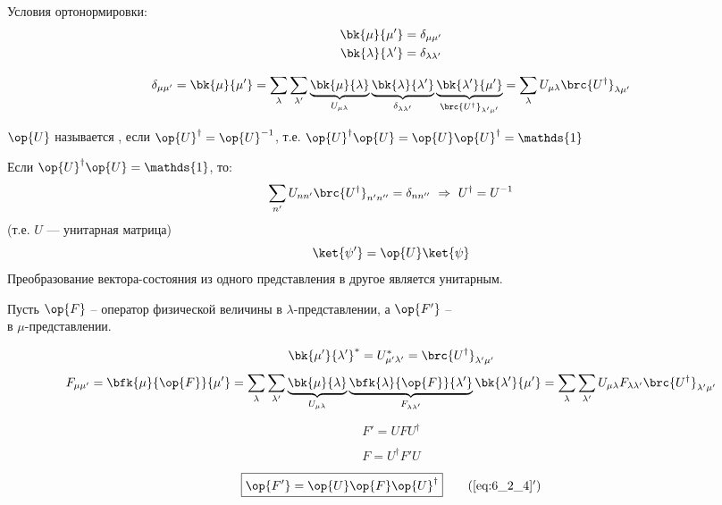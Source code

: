 Условия ортонормировки:
$$
\begin{gathered}
\bk{\mu}{\mu'}=\delta_{\mu\mu'}\\
\bk{\lambda}{\lambda'}=\delta_{\lambda\lambda'}
\end{gathered}
$$

$$
\delta_{\mu\mu'} = 
\bk{\mu}{\mu'} =
\sum_\lambda \sum_{\lambda'} \underbrace{\bk{\mu}{\lambda}}_{U_{\mu\lambda}}
\underbrace{\bk{\lambda}{\lambda'}}_{\delta_{\lambda\lambda'}}
\underbrace{\bk{\lambda'}{\mu'}}_{\brc{U^\dag}_{\lambda'\mu'}} =
\sum_\lambda U_{\mu\lambda}\brc{U^\dag}_{\lambda\mu'}
$$

\begin{defn}
$\op{U}$ называется , если $\op{U}^\dag = \op{U}^{-1}$, т.е. $\op{U}^\dag\op{U}=\op{U}\op{U}^\dag=\mathds{1}$
\end{defn}

Если $\op{U}^\dag\op{U}=\mathds{1}$, то:
$$
\sum_{n'}U_{nn'} \brc{U^\dag}_{n'n''}=\delta_{nn''}~ \Rightarrow~ U^\dag=U^{-1} 
$$
(т.е. $U$ --- унитарная матрица)
\begin{equation}
\label{eq:6_2_2}
\ket{\psi'}=\op{U}\ket{\psi}
\end{equation}
Преобразование вектора-состояния из одного представления в другое является унитарным. 

Пусть $\op{F}$ -- оператор физической величины в $\lambda$-представлении, а $\op{F'}$ --\\
в $\mu$-представлении.

$$
\bk{\mu'}{\lambda'}^*=U^*_{\mu'\lambda'}=\brc{U^\dag}_{\lambda'\mu'}
$$
\begin{equation}
\label{eq:6_2_3}
F_{\mu\mu'} = 
\bfk{\mu}{\op{F}}{\mu'} =
\sum_\lambda \sum_{\lambda'} 
\underbrace{\bk{\mu}{\lambda}}_{U_{\mu\lambda}}
\underbrace{\bfk{\lambda}{\op{F}}{\lambda'}}_{F_{\lambda\lambda'}}
\bk{\lambda'}{\mu'} =
\sum_\lambda \sum_{\lambda'} U_{\mu\lambda} F_{\lambda\lambda'} \brc{U^\dag}_{\lambda'\mu'}
\end{equation}

\begin{equation}
\label{eq:6_2_4}
\boxed{F'=U F U^\dag}
\end{equation}

\begin{equation}
\label{eq:6_2_5}
\boxed{F=U^\dag F' U}
\end{equation}

\begin{equation}
\label{eq:6_2_4_add}
\boxed{\op{F'}=\op{U} \op{F} \op{U}^\dag}
\tag{\ref{eq:6_2_4}$'$}
\end{equation}

